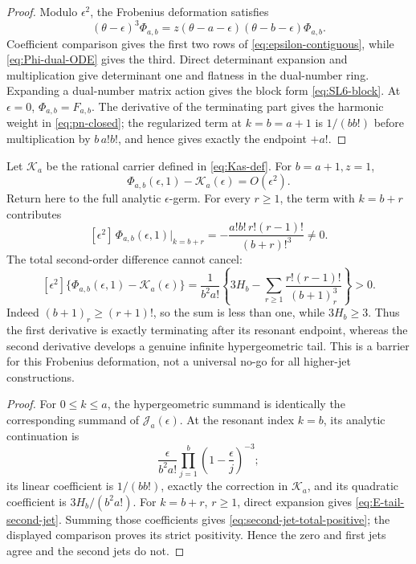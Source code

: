 \begin{proof}
Modulo \(\epsilon^2\), the Frobenius deformation satisfies
\begin{equation}\label{eq:Phi-dual-ODE}
 (\theta-\epsilon)^3\Phi_{a,b}
 =z(\theta-a-\epsilon)(\theta-b-\epsilon)\Phi_{a,b}.
\end{equation}
Coefficient comparison gives the first two rows of
\eqref{eq:epsilon-contiguous}, while \eqref{eq:Phi-dual-ODE} gives the third.
Direct determinant expansion and multiplication give determinant one and
flatness in the dual-number ring.  Expanding a
dual-number matrix action gives the block form \eqref{eq:SL6-block}.
At \(\epsilon=0\), \(\Phi_{a,b}=F_{a,b}\).  The derivative of the terminating
part gives the harmonic weight in \eqref{eq:pn-closed}; the regularized term
at \(k=b=a+1\) is \(1/(bb!)\) before multiplication by \(b\,a!b!\), and
hence gives exactly the endpoint \(+a!\).
\end{proof}

\begin{proposition}
\label{prop:first-jet-barrier}
Let \(\mathscr K_a\) be the rational carrier defined in
\eqref{eq:Kas-def}.  For \(b=a+1,z=1\),
\begin{equation}\label{eq:Phi-K-contact}
 \Phi_{a,b}(\epsilon,1)-\mathscr K_a(\epsilon)=O(\epsilon^2).
\end{equation}
Return here to the full analytic \(\epsilon\)-germ.  For every \(r\ge1\),
the term with \(k=b+r\) contributes
\begin{equation}\label{eq:E-tail-second-jet}
 [\epsilon^2]\,\Phi_{a,b}(\epsilon,1)\big|_{k=b+r}
 =-\frac{a!b!\,r!(r-1)!}{(b+r)!^3}\ne0.
\end{equation}
The total second-order difference cannot cancel:
\begin{equation}\label{eq:second-jet-total-positive}
 [\epsilon^2]\{\Phi_{a,b}(\epsilon,1)-\mathscr K_a(\epsilon)\}
 =
 \frac1{b^2a!}\left\{
 3H_b-\sum_{r\ge1}\frac{r!(r-1)!}{(b+1)_r^3}\right\}>0.
\end{equation}
Indeed \((b+1)_r\ge(r+1)!\), so the sum is less than one, while
\(3H_b\ge3\).
Thus the first derivative is exactly terminating after its resonant endpoint,
whereas the second derivative develops a genuine infinite hypergeometric
tail.  This is a barrier for this Frobenius deformation, not a universal
no-go for all higher-jet constructions.
\end{proposition}

\begin{proof}
For \(0\le k\le a\), the hypergeometric summand is identically the
corresponding summand of \(\mathscr J_a(\epsilon)\).  At the resonant index
\(k=b\), its analytic continuation is
\[
 \frac{\epsilon}{b^2a!}
 \prod_{j=1}^b\left(1-\frac{\epsilon}{j}\right)^{-3};
\]
its linear coefficient is \(1/(bb!)\), exactly the correction in
\(\mathscr K_a\), and its quadratic coefficient is
\(3H_b/(b^2a!)\).  For \(k=b+r\), \(r\ge1\), direct expansion gives
\eqref{eq:E-tail-second-jet}.  Summing those coefficients gives
\eqref{eq:second-jet-total-positive}; the displayed comparison proves its
strict positivity.  Hence the zero and first jets agree and the second
jets do not.
\end{proof}

